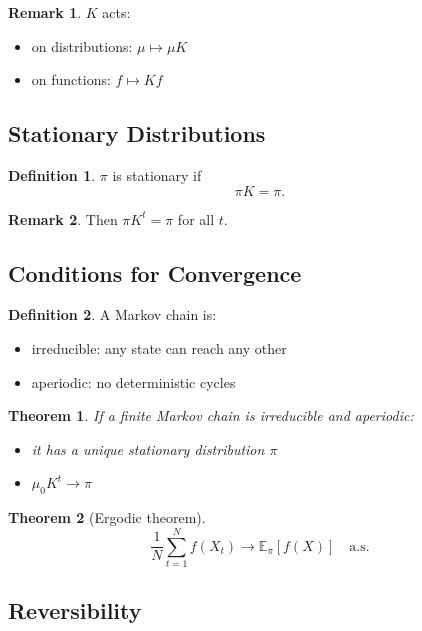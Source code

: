 \documentclass[12pt,oneside]{book}
\numberwithin{equation}{section}
\theoremstyle{definition}
\newtheorem{definition}{Definition}[section]
\newtheorem{remark}{Remark}[section]
\theoremstyle{plain}
\newtheorem{theorem}{Theorem}[section]
\theoremstyle{remark}
\newcommand{\E}{\mathbb{E}}
\begin{document}
\begin{remark}
$K$ acts:
\begin{itemize}
\item on distributions: $\mu \mapsto \mu K$
\item on functions: $f \mapsto Kf$
\end{itemize}
\end{remark}


\subsection{Stationary Distributions}

\begin{definition}
$\pi$ is stationary if
\[
\pi K = \pi.
\]
\end{definition}

\begin{remark}
Then $\pi K^t = \pi$ for all $t$.
\end{remark}


\subsection{Conditions for Convergence}

\begin{definition}
A Markov chain is:
\begin{itemize}
\item irreducible: any state can reach any other
\item aperiodic: no deterministic cycles
\end{itemize}
\end{definition}

\begin{theorem}
If a finite Markov chain is irreducible and aperiodic:
\begin{itemize}
\item it has a unique stationary distribution $\pi$
\item $\mu_0 K^t \to \pi$
\end{itemize}
\end{theorem}

\begin{theorem}[Ergodic theorem]
\[
\frac{1}{N}\sum_{t=1}^N f(X_t) \to \E_\pi[f(X)] \quad \text{a.s.}
\]
\end{theorem}


\subsection{Reversibility}
\end{document}
